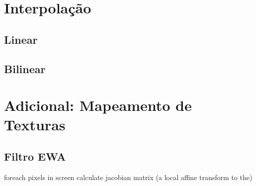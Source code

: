 \section{Interpolação}
\subsection{Linear}
\subsection{Bilinear}

\section{Adicional: Mapeamento de Texturas}
\subsection{Filtro EWA}
\par
foreach pixels in screen
{
  calculate jacobian matrix (a local affine transform to the)
}


